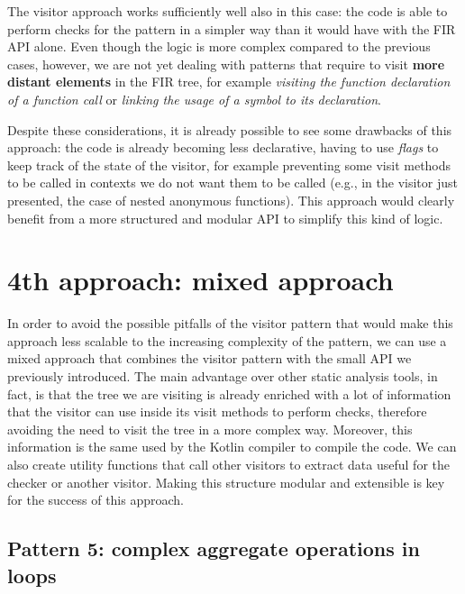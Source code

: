 \documentclass[12pt,a4paper,openright,twoside]{book}
\begin{document}
The visitor approach works sufficiently well also in this case: the code is able
to perform checks for the pattern in a simpler way than it would have with the
\ac{FIR} API alone. 
%
Even though the logic is more complex compared to the previous cases, however,
we are not yet dealing with patterns that require to visit \textbf{more distant
elements} in the \ac{FIR} tree, for example \emph{visiting the function
declaration of a function call} or \emph{linking the usage of a symbol to its
declaration}. 

Despite these considerations, it is already possible to see some drawbacks of
this approach: the code is already becoming less declarative, having to use
\emph{flags} to keep track of the state of the visitor, for example preventing
some visit methods to be called in contexts we do not want them to be called
(e.g., in the visitor just presented, the case of nested anonymous functions). 
%
This approach would clearly benefit from a more structured and modular API to
simplify this kind of logic.

\section{4th approach: mixed approach}

In order to avoid the possible pitfalls of the visitor pattern that would make
this approach less scalable to the increasing complexity of the pattern, we can
use a mixed approach that combines the visitor pattern with the small API we
previously introduced. The main advantage over other static analysis tools, in
fact, is that the tree we are visiting is already enriched with a lot of
information that the visitor can use inside its visit methods to perform checks,
therefore avoiding the need to visit the tree in a more complex way. Moreover,
this information is the same used by the Kotlin compiler to compile the code.
%
We can also create utility functions that call other visitors to extract data
useful for the checker or another visitor. Making this structure modular and
extensible is key for the success of this approach.

\subsection{Pattern 5: complex aggregate operations in loops} \label{sec:p5}
\end{document}
